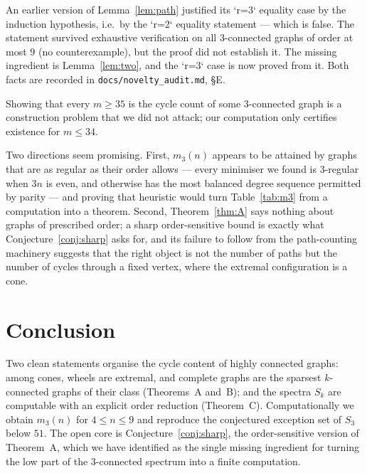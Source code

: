 \documentclass[11pt,a4paper]{article}
\theoremstyle{definition}
\begin{document}
\begin{description}[leftmargin=0pt,style=nextline]
\item[A proof gap was found by red-teaming and fixed, not hidden.]  An earlier
  version of Lemma~\ref{lem:path} justified its `r=3` equality case by the
  induction hypothesis, i.e.\ by the `r=2` equality statement --- which is
  false.  The statement survived exhaustive verification on all $3$-connected
  graphs of order at most $9$ (no counterexample), but the proof did not
  establish it.  The missing ingredient is Lemma~\ref{lem:two}, and the `r=3`
  case is now proved from it.  Both facts are recorded in
  \texttt{docs/novelty\_audit.md}, §E.
\item[No claim about the existence direction of Conjecture 6(a).]  Showing
  that every $m\ge 35$ is the cycle count of some $3$-connected graph is a
  construction problem that we did not attack; our computation only certifies
  existence for $m\le 34$.
\end{description}

Two directions seem promising.  First, $m_3(n)$ appears to be attained by
graphs that are as regular as their order allows --- every minimiser we found is
$3$-regular when $3n$ is even, and otherwise has the most balanced degree
sequence permitted by parity --- and proving that heuristic would turn
Table~\ref{tab:m3} from a computation into a theorem.  Second,
Theorem~\ref{thm:A} says nothing about graphs of prescribed order; a sharp
order-sensitive bound is exactly what Conjecture~\ref{conj:sharp} asks for, and
its failure to follow from the path-counting machinery suggests that the right
object is not the number of paths but the number of cycles through a fixed
vertex, where the extremal configuration is a cone.

\section{Conclusion}

Two clean statements organise the cycle content of highly connected graphs:
among cones, wheels are extremal, and complete graphs are the sparsest
$k$-connected graphs of their class (Theorems~A and~B); and the spectra
$S_k$ are computable with an explicit order reduction (Theorem~C).
Computationally we obtain $m_3(n)$ for $4\le n\le 9$ and reproduce the
conjectured exception set of $S_3$ below $51$.  The open core is
Conjecture~\ref{conj:sharp}, the order-sensitive version of Theorem~A, which
we have identified as the single missing ingredient for turning the low part of
the $3$-connected spectrum into a finite computation.
\end{document}

